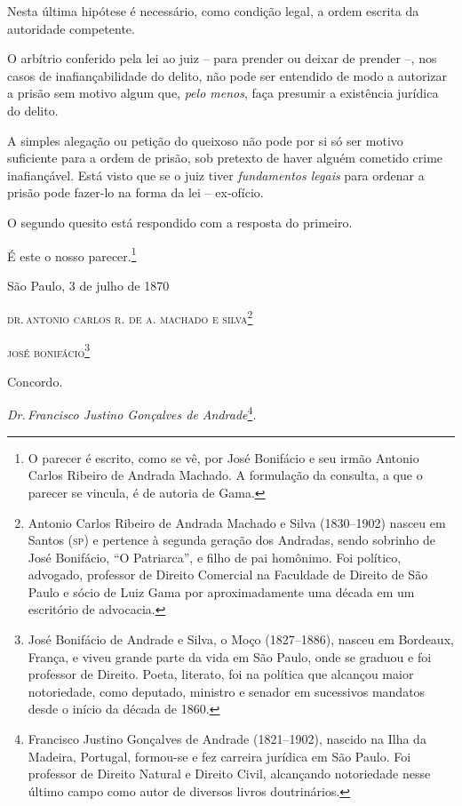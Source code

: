 Nesta última hipótese é necessário, como condição legal, a ordem escrita
da autoridade competente.

O arbítrio conferido pela lei ao juiz -- para prender ou deixar de
prender --, nos casos de inafiançabilidade do delito, não pode ser
entendido de modo a autorizar a prisão sem motivo algum que, \emph{pelo
menos}, faça presumir a existência jurídica do delito.

A simples alegação ou petição do queixoso não pode por si só ser motivo
suficiente para a ordem de prisão, sob pretexto de haver alguém cometido
crime inafiançável. Está visto que se o juiz tiver \emph{fundamentos
legais} para ordenar a prisão pode fazer-lo na forma da lei --
ex-ofício.

O segundo quesito está respondido com a resposta do primeiro.

É este o nosso parecer.\footnote{ O parecer é escrito, como se vê, por
  José Bonifácio e seu irmão Antonio Carlos Ribeiro de Andrada Machado.
  A formulação da consulta, a que o parecer se vincula, é de autoria de
  Gama.}

\begin{flushright}
São Paulo, 3 de julho de 1870

\textsc{dr.\,antonio carlos r. de a. machado e silva}\footnote{ Antonio
  Carlos Ribeiro de Andrada Machado e Silva (1830--1902) nasceu em Santos
  (\textsc{sp}) e pertence à segunda geração dos Andradas, sendo sobrinho de José
  Bonifácio, ``O Patriarca'', e filho de pai homônimo. Foi político,
  advogado, professor de Direito Comercial na Faculdade de Direito de
  São Paulo e sócio de Luiz Gama por aproximadamente uma década em um
  escritório de advocacia.}

\textsc{josé bonifácio}\footnote{ José Bonifácio de Andrade e Silva, o
  Moço (1827--1886), nasceu em Bordeaux, França, e viveu grande parte da
  vida em São Paulo, onde se graduou e foi professor de Direito. Poeta,
  literato, foi na política que alcançou maior notoriedade, como
  deputado, ministro e senador em sucessivos mandatos desde o início da
  década de 1860.}
\end{flushright}

Concordo.

\emph{Dr.\,Francisco Justino Gonçalves de Andrade}\footnote{ Francisco
  Justino Gonçalves de Andrade (1821--1902), nascido na Ilha da Madeira,
  Portugal, formou-se e fez carreira jurídica em São Paulo. Foi
  professor de Direito Natural e Direito Civil, alcançando notoriedade
  nesse último campo como autor de diversos livros doutrinários.}.

